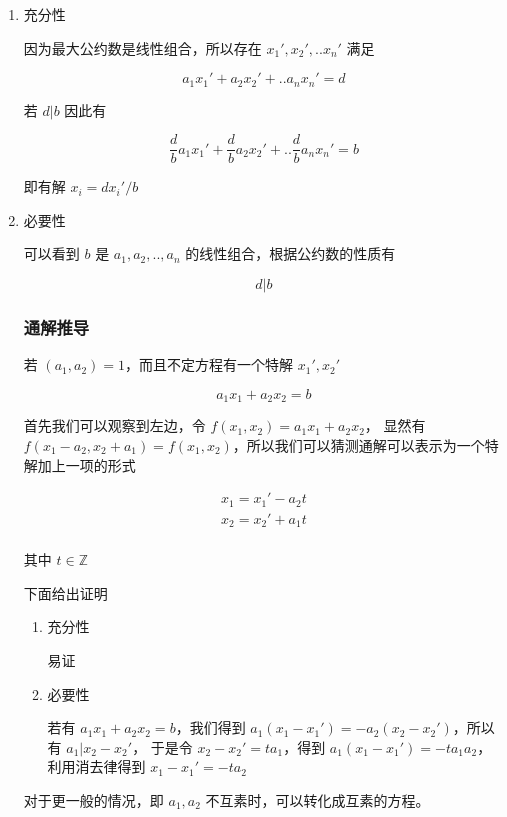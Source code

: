 \documentclass[12pt,a4paper]{ctexart}
\begin{document}
\begin{enumerate}
    \item 充分性

    因为最大公约数是线性组合，所以存在 $x_1', x_2', .. x_n'$ 满足

    \[
    a_1x_1' + a_2x_2' + .. a_n x_n' = d
    \]

    若 $d \vert b$ 因此有

    \[
    \frac{d}{b}a_1x_1' + \frac{d}{b}a_2x_2' + .. \frac{d}{b}a_n x_n' = b
    \]

    即有解 $x_i = dx_i'/b$

    \item 必要性
    
    可以看到 $b$ 是 $a_1,a_2,..,a_n$ 的线性组合，根据公约数的性质有

    \[
        d \vert b
    \]

\subsubsection{通解推导}

若 $(a_1,a_2) = 1$，而且不定方程有一个特解 $x_1', x_2'$

\[
a_1x_1 + a_2x_2 = b
\]

首先我们可以观察到左边，令 $f(x_1,x_2) = a_1x_1 + a_2x_2$，
显然有 $f(x_1-a_2, x_2 + a_1) = f(x_1, x_2)$，所以我们可以猜测通解可以表示为一个特解加上一项的形式

\begin{align*}
x_1 = x_1' - a_2 t \\
x_2 = x_2' + a_1 t \\
\end{align*}

其中 $t \in \mathbb{Z}$

下面给出证明

\begin{enumerate}
    \item 充分性

    易证

    \item 必要性

    若有 $a_1x_1 + a_2x_2 = b$，我们得到 $a_1(x_1 - x_1') = -a_2(x_2 - x_2')$，所以有 $a_1 \vert x_2-x_2'$，
    于是令 $x_2 - x_2' = t a_1$，得到 $a_1(x_1 -x_1') = -ta_1a_2$，利用消去律得到 $x_1 - x_1' = -ta_2$
\end{enumerate}

对于更一般的情况，即 $a_1, a_2$ 不互素时，可以转化成互素的方程。



\end{enumerate}
\end{document}
